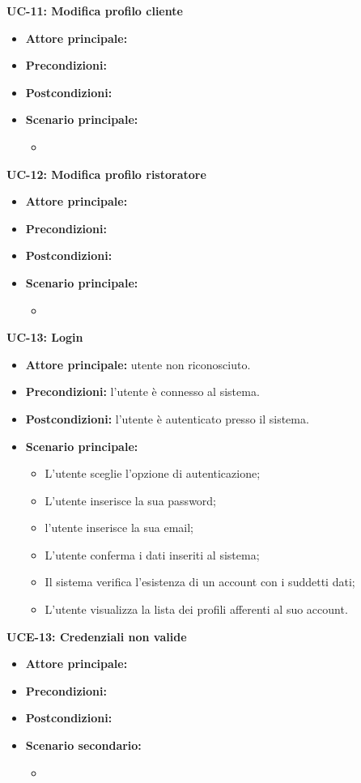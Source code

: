\textbf{UC-11: Modifica profilo cliente}
\begin{itemize}
\item \textbf{Attore principale:} 
\item \textbf{Precondizioni:} 
\item \textbf{Postcondizioni:} 
\item \textbf{Scenario principale:}
\begin{itemize}
    \item 
\end{itemize}
\end{itemize}

\textbf{UC-12: Modifica profilo ristoratore}
\begin{itemize}
\item \textbf{Attore principale:} 
\item \textbf{Precondizioni:} 
\item \textbf{Postcondizioni:} 
\item \textbf{Scenario principale:}
\begin{itemize}
    \item 
\end{itemize}
\end{itemize}

\textbf{UC-13: Login}
\begin{itemize}
\item \textbf{Attore principale:} utente non riconosciuto.
\item \textbf{Precondizioni:} l'utente è connesso al sistema.
\item \textbf{Postcondizioni:} l'utente è autenticato presso il sistema.
\item \textbf{Scenario principale:}
\begin{itemize}
    \item L'utente sceglie l'opzione di autenticazione;
    \item L'utente inserisce la sua password;
    \item l'utente inserisce la sua email;
    \item L'utente conferma i dati inseriti al sistema;
    \item Il sistema verifica l'esistenza di un account con i suddetti dati;
    \item L'utente visualizza la lista dei profili afferenti al suo account.
\end{itemize}
\end{itemize}

\textbf{UCE-13: Credenziali non valide}
\begin{itemize}
\item \textbf{Attore principale:}
\item \textbf{Precondizioni:} 
\item \textbf{Postcondizioni:} 
\item \textbf{Scenario secondario:}
\begin{itemize}
    \item 
\end{itemize}
\end{itemize}

